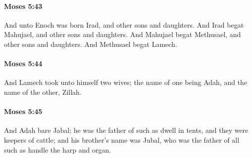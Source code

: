 		\paragraph{Moses 5:43} %
			\label{MOSES-5-43}

			And unto Enoch was born Irad, and other sons and daughters. And Irad begat Mahujael, and other sons and daughters. And Mahujael begat Methusael, and other sons and daughters. And Methusael begat Lamech.


		\paragraph{Moses 5:44} %
			\label{MOSES-5-44}

			And Lamech took unto himself two wives; the name of one being Adah, and the name of the other, Zillah.


		\paragraph{Moses 5:45} %
			\label{MOSES-5-45}

			And Adah bare Jabal; he was the father of such as dwell in tents, and they were keepers of cattle; and his brother's name was Jubal, who was the father of all such as handle the harp and organ.


